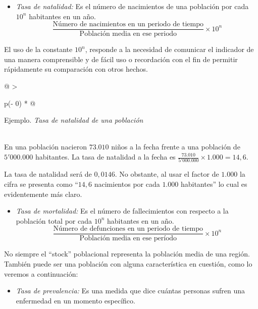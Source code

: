 \documentclass[
  11pt,
]{book}
\providecommand{\tightlist}{%
  \setlength{\itemsep}{0pt}\setlength{\parskip}{0pt}}
\begin{document}
\begin{itemize}
\tightlist
\item
  \emph{Tasa de natalidad:} Es el número de nacimientos de una población por cada \(10^n\) habitantes en un año.
  \[\frac{\text{Número de nacimientos en un periodo de tiempo}}{\text{Población media en ese periodo}}\times 10^n\]
\end{itemize}

El uso de la constante \(10^n\), responde a la necesidad de comunicar el indicador de una manera comprensible y de fácil uso o recordación con el fin de permitir rápidamente su comparación con otros hechos.

\begin{longtable}[]{@{}
  >{\raggedright\arraybackslash}p{(\columnwidth - 0\tabcolsep) * }@{}}
\toprule
\begin{minipage}[b]{\linewidth}\raggedright
Ejemplo. \emph{Tasa de natalidad de una población}
\end{minipage} \\
\midrule
\endhead
En una población nacieron \(73.010\) niños a la fecha frente a una población de \(5'000.000\) habitantes. La tasa de natalidad a la fecha es \(\frac{73.010}{5'000.000}\times 1.000=14,6\). \\
\bottomrule
\end{longtable}

La tasa de natalidad será de \(0,0146\). No obstante, al usar el factor de \(1.000\) la cifra se presenta como ``\(14,6\) nacimientos por cada \(1.000\) habitantes'' lo cual es evidentemente más claro.

\begin{itemize}
\tightlist
\item
  \emph{Tasa de mortalidad:} Es el número de fallecimientos con respecto a la población total por cada \(10^n\) habitantes en un año.
  \[\frac{\text{Número de defunciones en un periodo de tiempo}}{\text{Población media en ese período}}\times 10^n\]
\end{itemize}

No siempre el ``stock'' poblacional representa la población media de una región. También puede ser una población con alguna característica en cuestión, como lo veremos a continuación:

\begin{itemize}
\tightlist
\item
  \emph{Tasa de prevalencia:} Es una medida que dice cuántas personas sufren una enfermedad en un momento específico.
\end{itemize}
\end{document}
